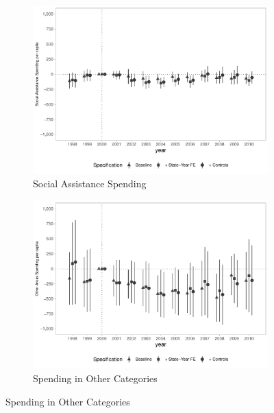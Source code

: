 \begin{figure}[h]
\begin{center}
\begin{subfigure}{0.32\textwidth}
        \centering
        \caption{\scriptsize Social Assistance Spending}\label{fig:finbra3_e}
        \includegraphics[width=\textwidth]{plots/spending/finbra_desp_assist_prev_pcapita_dist_ec29_baseline_dist_ec29_baseline_full.pdf}
    \end{subfigure}
    \begin{subfigure}{0.32\textwidth}
        \centering
        \caption{\scriptsize Spending in Other Categories}\label{fig:finbra3_f}
        \includegraphics[width=\textwidth]{plots/spending/finbra_desp_outros_area_pcapita_dist_ec29_baseline_dist_ec29_baseline_full.pdf}
    \end{subfigure}
    
    \end{center}
    
\end{figure}



